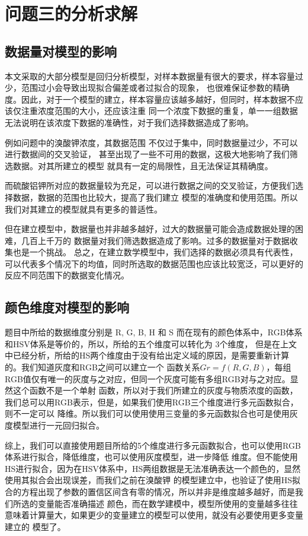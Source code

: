 \section{问题三的分析求解}
\subsection{数据量对模型的影响}
   本文采取的大部分模型是回归分析模型，对样本数据量有很大的要求，样本容量过少，范围过小会导致出现拟合偏差或者过拟合的现象，
   也很难保证参数的精确度。因此，对于一个模型的建立，样本容量应该越多越好，但同时，样本数据不应该仅注重浓度范围的大小，还应该注重
   同一个浓度下数据的重复，单一一组数据无法说明在该浓度下数据的准确性，对于我们选择数据造成了影响。
   
   例如问题中的溴酸钾浓度，其数据范围 不仅过于集中，同时数据量过少，不可以进行数据间的交叉验证，
   甚至出现了一些不可用的数据，这极大地影响了我们筛选数据。对其所建立的模型 就具有一定的局限性，且无法保证其精确度。

   而硫酸铝钾所对应的数据量较为充足，可以进行数据之间的交叉验证，方便我们选择数据，数据的范围也比较大，提高了我们建立
   模型的准确度和使用范围。所以我们对其建立的模型就具有更多的普适性。
   
   但在建立模型中，数据量也并非越多越好，过大的数据量可能会造成数据处理的困难，几百上千万的
   数据量对我们筛选数据造成了影响。过多的数据量对于数据收集也是一个挑战。
   总之，在建立数学模型中，我们选择的数据必须具有代表性，可以代表多个情况下的均值，同时所选取的数据范围也应该比较宽泛，可以更好的
   反应不同范围下的数据变化情况。

\subsection{颜色维度对模型的影响}
    题目中所给的数据维度分别是 R, G, B, H 和 S 而在现有的颜色体系中，RGB体系和HSV体系是等价的，所以，所给的五个维度可以转化为
    3个维度， 但是在上文中已经分析，所给的HS两个维度由于没有给出定义域的原因，是需要重新计算的。我们知道灰度和RGB之间可以建立一个
    函数关系$Gr = f(R, G, B)$，每组RGB值仅有唯一的灰度与之对应，但同一个灰度可能有多组RGB对与之对应。显然这个函数不是一个单射
    函数，所以对于我们所建立的灰度与物质浓度的函数，我们总可以用RGB表示，但是，如果我们使用RGB三个维度进行多元函数拟合，则不一定可以
    降维。所以我们可以使用使用三变量的多元函数拟合也可是使用灰度模型进行一元回归拟合。
    
    综上，我们可以直接使用题目所给的5个维度进行多元函数拟合，也可以使用RGB体系进行拟合，降低维度，也可以使用灰度模型，进一步降低
    维度。但不能使用HS进行拟合，因为在HSV体系中，HS两组数据是无法准确表达一个颜色的，显然使用其拟合会出现误差，而我们之前在溴酸钾
    的模型建立中，也验证了使用HS拟合的方程出现了参数的置信区间含有零的情况，所以并非是维度越多越好，而是我们所选的变量能否准确描述
    颜色，而在数学建模中，模型所使用的变量越多往往意味着计算量大，如果更少的变量建立的模型可以使用，就没有必要使用更多变量建立的
    模型了。
